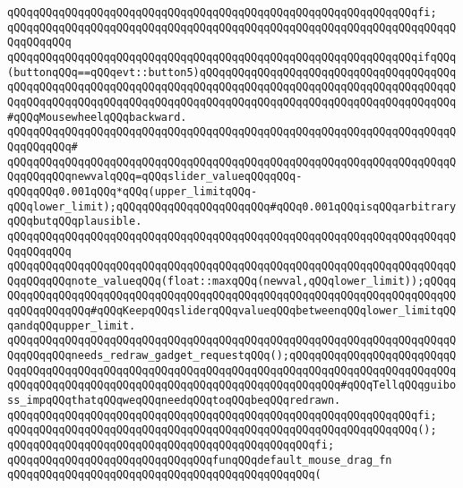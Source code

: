 \verb|qQQqqQQqqQQqqQQqqQQqqQQqqQQqqQQqqQQqqQQqqQQqqQQqqQQqqQQqqQQqqQQqfi;|\newline
\verb|qQQqqQQqqQQqqQQqqQQqqQQqqQQqqQQqqQQqqQQqqQQqqQQqqQQqqQQqqQQqqQQqqQQqqQQqqQQqqQQq|\newline
\verb|qQQqqQQqqQQqqQQqqQQqqQQqqQQqqQQqqQQqqQQqqQQqqQQqqQQqqQQqqQQqqQQqifqQQq(buttonqQQq==qQQqevt::button5)qQQqqQQqqQQqqQQqqQQqqQQqqQQqqQQqqQQqqQQqqQQqqQQqqQQqqQQqqQQqqQQqqQQqqQQqqQQqqQQqqQQqqQQqqQQqqQQqqQQqqQQqqQQqqQQqqQQqqQQqqQQqqQQqqQQqqQQqqQQqqQQqqQQqqQQqqQQqqQQqqQQqqQQqqQQqqQQqqQQq#qQQqMousewheelqQQqbackward.|\newline
\verb|qQQqqQQqqQQqqQQqqQQqqQQqqQQqqQQqqQQqqQQqqQQqqQQqqQQqqQQqqQQqqQQqqQQqqQQqqQQqqQQq#|\newline
\verb|qQQqqQQqqQQqqQQqqQQqqQQqqQQqqQQqqQQqqQQqqQQqqQQqqQQqqQQqqQQqqQQqqQQqqQQqqQQqqQQqnewvalqQQq=qQQqslider_valueqQQqqQQq-qQQqqQQq0.001qQQq*qQQq(upper_limitqQQq-qQQqlower_limit);qQQqqQQqqQQqqQQqqQQqqQQq#qQQq0.001qQQqisqQQqarbitraryqQQqbutqQQqplausible.|\newline
\verb|qQQqqQQqqQQqqQQqqQQqqQQqqQQqqQQqqQQqqQQqqQQqqQQqqQQqqQQqqQQqqQQqqQQqqQQqqQQqqQQq|\newline
\verb|qQQqqQQqqQQqqQQqqQQqqQQqqQQqqQQqqQQqqQQqqQQqqQQqqQQqqQQqqQQqqQQqqQQqqQQqqQQqqQQqnote_valueqQQq(float::maxqQQq(newval,qQQqlower_limit));qQQqqQQqqQQqqQQqqQQqqQQqqQQqqQQqqQQqqQQqqQQqqQQqqQQqqQQqqQQqqQQqqQQqqQQqqQQqqQQqqQQqqQQq#qQQqKeepqQQqsliderqQQqvalueqQQqbetweenqQQqlower_limitqQQqandqQQqupper_limit.|\newline
\newline
\verb|qQQqqQQqqQQqqQQqqQQqqQQqqQQqqQQqqQQqqQQqqQQqqQQqqQQqqQQqqQQqqQQqqQQqqQQqqQQqqQQqneeds_redraw_gadget_requestqQQq();qQQqqQQqqQQqqQQqqQQqqQQqqQQqqQQqqQQqqQQqqQQqqQQqqQQqqQQqqQQqqQQqqQQqqQQqqQQqqQQqqQQqqQQqqQQqqQQqqQQqqQQqqQQqqQQqqQQqqQQqqQQqqQQqqQQqqQQqqQQqqQQqqQQq#qQQqTellqQQqguiboss_impqQQqthatqQQqweqQQqneedqQQqtoqQQqbeqQQqredrawn.|\newline
\verb|qQQqqQQqqQQqqQQqqQQqqQQqqQQqqQQqqQQqqQQqqQQqqQQqqQQqqQQqqQQqqQQqfi;|\newline
\newline
\verb|qQQqqQQqqQQqqQQqqQQqqQQqqQQqqQQqqQQqqQQqqQQqqQQqqQQqqQQqqQQqqQQq();|\newline
\verb|qQQqqQQqqQQqqQQqqQQqqQQqqQQqqQQqqQQqqQQqqQQqqQQqfi;|\newline
\newline
\verb|qQQqqQQqqQQqqQQqqQQqqQQqqQQqqQQqfunqQQqdefault_mouse_drag_fn|\newline
\verb|qQQqqQQqqQQqqQQqqQQqqQQqqQQqqQQqqQQqqQQqqQQqqQQq(|\newline
